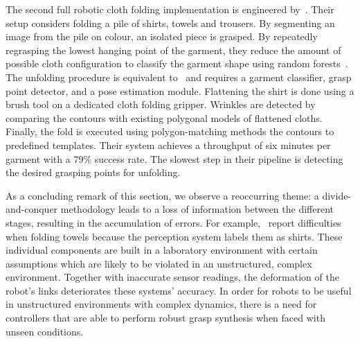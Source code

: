 The second full robotic cloth folding implementation is engineered by~\textcite{Doumanoglou2016}. Their setup considers folding a pile of shirts, towels and trousers. By segmenting an image from the pile on colour, an isolated piece is grasped. By repeatedly regrasping the lowest hanging point of the garment, they reduce the amount of possible cloth configuration to classify the garment shape using random forests~\autocite{Breiman2001}. The unfolding procedure is equivalent to~\autocite{Maitin2010} and requires a garment classifier, grasp point detector, and a pose estimation module. Flattening the shirt is done using a brush tool on a dedicated cloth folding gripper. Wrinkles are detected by comparing the contours with existing polygonal models of flattened cloths. Finally, the fold is executed using polygon-matching methods the contours to predefined templates.
Their system achieves a throughput of six minutes per garment with a $79\%$ success rate. The slowest step in their pipeline is detecting the desired grasping points for unfolding.

As a concluding remark of this section, we observe a reoccurring theme: a divide-and-conquer methodology leads to a loss of information between the different stages, resulting in the accumulation of errors. For example,~\textcite{Doumanoglou2016} report difficulties when folding towels because the perception system labels them as shirts. These individual components are built in a laboratory environment with certain assumptions which are likely to be violated in an unstructured, complex environment. Together with inaccurate sensor readings, the deformation of the robot's links deteriorates these systems' accuracy. 
In order for robots to be useful in unstructured environments with complex dynamics, there is a need for controllers that are able to perform robust grasp synthesis when faced with unseen conditions.

